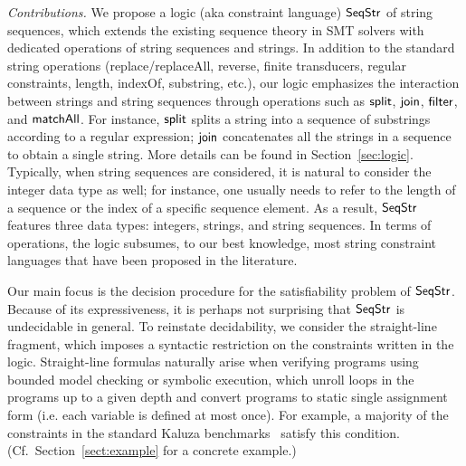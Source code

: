 \smallskip
\noindent\emph{Contributions.} We propose a logic (aka constraint language) ${\sf SeqStr}$ of string sequences, which extends the existing sequence theory in SMT solvers with dedicated operations of string sequences and strings. In addition to the standard string operations (replace/replaceAll, reverse, finite transducers, regular constraints, 
length, indexOf, substring, etc.), our logic emphasizes the interaction between strings and string sequences through operations such as $\mathsf{split}$, $\mathsf{join}$, ${\sf filter}$, and $\mathsf{matchAll}$. For instance, $\mathsf{split}$ splits a string into a sequence of substrings according to a regular expression; $\mathsf{join}$ concatenates all the strings in a sequence to obtain a single string. More details can be found in Section~\ref{sec:logic}. Typically, when string sequences are considered, it is natural to consider the integer data type as well; for instance, one usually needs to refer to the length of a sequence or the index of a specific sequence element. As a result, ${\sf SeqStr}$ features three data types: integers, strings, and string sequences. In terms of operations, the logic subsumes, to our best knowledge, most string constraint languages that have been proposed in the literature. 

%

Our main focus is the decision procedure for the satisfiability problem of  ${\sf SeqStr}$. 
Because of its expressiveness, it is perhaps not surprising that ${\sf SeqStr}$ is undecidable in general. To reinstate decidability, we consider the straight-line fragment, which imposes a syntactic restriction on the constraints written in the logic. %
Straight-line formulas naturally arise when verifying programs using
bounded model checking or  symbolic execution, 
which unroll loops in the programs up to a given
depth and convert programs to static single assignment form (i.e. each variable is defined at most once). For example, a majority of the constraints in the standard Kaluza
benchmarks~\cite{SAHMMS10} %
satisfy this condition. (Cf.\ Section~\ref{sect:example} for a concrete example.)  



